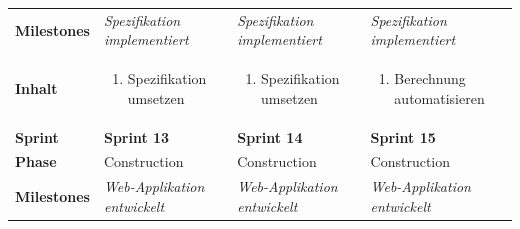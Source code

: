 \begin{landscape}
\begin{longtable}{l p{6.5cm} p{6.5cm} p{6.5cm}}
        \textbf{Milestones}
                                & \textit{Spezifikation implementiert}
                                & \textit{Spezifikation implementiert}
                                & \textit{Spezifikation implementiert}  \\

        \textbf{Inhalt}
                                & \begin{enumerate}[noitemsep]
                                    \item Spezifikation umsetzen
                                \end{enumerate}
                                & \begin{enumerate}[noitemsep]
                                    \item Spezifikation umsetzen
                                \end{enumerate}
                                & \begin{enumerate}[noitemsep]
                                    \item Berechnung automatisieren
                                \end{enumerate} \\

        \pagebreak
        \toprule
        \textbf{Sprint}
                                & \textbf{Sprint 13}
                                & \textbf{Sprint 14}
                                & \textbf{Sprint 15}\\

        \midrule
        \textbf{Phase}
                                & Construction
                                & Construction
                                & Construction\\

        \textbf{Milestones}
                                & \textit{Web-Applikation entwickelt}
                                & \textit{Web-Applikation entwickelt}
                                & \textit{Web-Applikation entwickelt}\\


\end{longtable}
\end{landscape}

